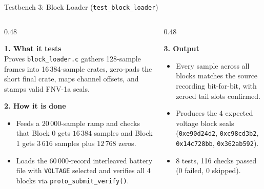 \begin{frame}{Testbench 3: Block Loader (\texttt{test\_block\_loader})}
  \begin{columns}[t, onlytextwidth]
    \begin{column}{0.48\textwidth}
      \smalltext\compactitem
      \begin{highlight}
        \textbf{1. What it tests} \\
        Proves \texttt{block\_loader.c} gathers 128-sample frames into 16\,384-sample crates, zero-pads the short final crate, maps channel offsets, and stamps valid FNV-1a seals.
      \end{highlight}
      \vskip0.5mm
      \begin{tech}
        \textbf{2. How it is done}
        \begin{itemize}
          \item Feeds a 20\,000-sample ramp and checks that Block 0 gets $16\,384$ samples and Block 1 gets $3\,616$ samples plus $12\,768$ zeros.
          \item Loads the 60\,000-record interleaved battery file with \texttt{VOLTAGE} selected and verifies all 4 blocks via \texttt{proto\_submit\_verify()}.
        \end{itemize}
      \end{tech}
    \end{column}
    \begin{column}{0.48\textwidth}
      \smalltext\compactitem
      \begin{tech}
        \textbf{3. Output}
        \begin{itemize}
          \item Every sample across all blocks matches the source recording bit-for-bit, with zeroed tail slots confirmed.
          \item Produces the 4 expected voltage block seals (\texttt{0xe90d24d2}, \texttt{0xc98cd3b2}, \texttt{0x14c728bb}, \texttt{0x362ab592}).
          \item \num{8 tests, 116 checks passed (0 failed, 0 skipped)}.
        \end{itemize}
      \end{tech}
      \vskip1.5mm
    \end{column}
  \end{columns}
\end{frame}

